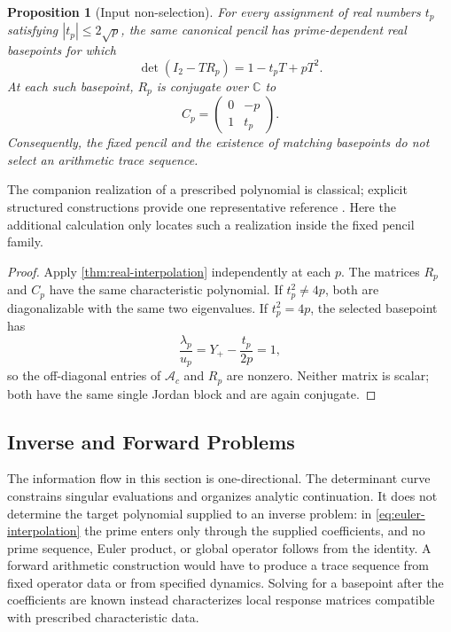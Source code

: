 \documentclass[11pt,reqno]{amsart}
\newtheorem{proposition}[theorem]{Proposition}
\theoremstyle{remark}
\newcommand{\C}{\mathbb C}
\newcommand{\cA}{\mathcal A}
\begin{document}
\begin{proposition}[Input non-selection]\label{prop:input-nonselection}
For every assignment of real numbers $t_p$ satisfying
$|t_p|\leq2\sqrt p$, the same canonical pencil has prime-dependent real
basepoints for which
\begin{equation}\label{eq:arbitrary-hasse-interpolation}
 \det(I_2-TR_p)=1-t_pT+pT^2.
\end{equation}
At each such basepoint, $R_p$ is conjugate over $\C$ to
\begin{equation}\label{eq:companion-matrix}
 C_p=\begin{pmatrix}0&-p\\1&t_p\end{pmatrix}.
\end{equation}
Consequently, the fixed pencil and the existence of matching basepoints do
not select an arithmetic trace sequence.
\end{proposition}

The companion realization of a prescribed polynomial is classical; explicit
structured constructions provide one representative reference
\cite{ChanCorless2016}.  Here the additional calculation only locates such a
realization inside the fixed pencil family.

\begin{proof}
Apply \cref{thm:real-interpolation} independently at each $p$.  The matrices
$R_p$ and $C_p$ have the same characteristic polynomial.  If
$t_p^2\ne4p$, both are diagonalizable with the same two eigenvalues.  If
$t_p^2=4p$, the selected basepoint has
\[
 \frac{\lambda_p}{u_p}
 =Y_+-\frac{t_p}{2p}=1,
\]
so the off-diagonal entries of $\cA_c$ and $R_p$ are nonzero.  Neither matrix
is scalar; both have the same single Jordan block and are again conjugate.
\end{proof}

\subsection{Inverse and Forward Problems}

The information flow in this section is one-directional.  The determinant
curve constrains singular evaluations and organizes analytic continuation.
It does not determine the target polynomial supplied to an inverse problem:
in \eqref{eq:euler-interpolation} the prime enters only through the supplied
coefficients, and no prime sequence, Euler product, or global operator
follows from the identity.  A forward arithmetic construction would have to
produce a trace sequence from fixed operator data or from specified
dynamics.  Solving for a basepoint after the coefficients are known instead
characterizes local response matrices compatible with prescribed
characteristic data.
\end{document}

